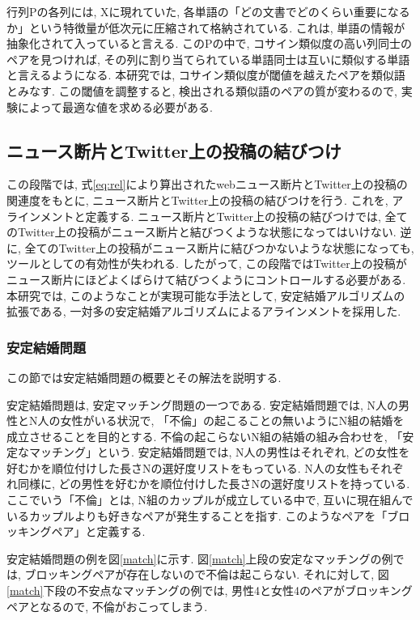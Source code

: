 \documentclass[12pt]{jarticle}
\begin{document}
行列Pの各列には, Xに現れていた, 各単語の「どの文書でどのくらい重要になるか」という特徴量が低次元に圧縮されて格納されている. これは, 単語の情報が抽象化されて入っていると言える. このPの中で, コサイン類似度の高い列同士のペアを見つければ, その列に割り当てられている単語同士は互いに類似する単語と言えるようになる. 本研究では, コサイン類似度が閾値を越えたペアを類似語とみなす. この閾値を調整すると, 検出される類似語のペアの質が変わるので, 実験によって最適な値を求める必要がある.

\subsection{ニュース断片とTwitter上の投稿の結びつけ}
この段階では, 式\ref{eq:rel}により算出されたwebニュース断片とTwitter上の投稿の関連度をもとに, ニュース断片とTwitter上の投稿の結びつけを行う. これを, アラインメントと定義する. ニュース断片とTwitter上の投稿の結びつけでは, 全てのTwitter上の投稿がニュース断片と結びつくような状態になってはいけない. 逆に, 全てのTwitter上の投稿がニュース断片に結びつかないような状態になっても, ツールとしての有効性が失われる. したがって, この段階ではTwitter上の投稿がニュース断片にほどよくばらけて結びつくようにコントロールする必要がある. 本研究では, このようなことが実現可能な手法として, 安定結婚アルゴリズム\cite{smp}の拡張である, 一対多の安定結婚アルゴリズム\cite{psmp}によるアラインメントを採用した.

\subsubsection{安定結婚問題}
この節では安定結婚問題の概要とその解法を説明する.

安定結婚問題\cite{smp}は, 安定マッチング問題の一つである.
安定結婚問題では, N人の男性とN人の女性がいる状況で, 「不倫」の起こることの無いようにN組の結婚を成立させることを目的とする.
不倫の起こらないN組の結婚の組み合わせを, 「安定なマッチング」という.
安定結婚問題では, N人の男性はそれぞれ, どの女性を好むかを順位付けした長さNの選好度リストをもっている.
N人の女性もそれぞれ同様に, どの男性を好むかを順位付けした長さNの選好度リストを持っている.
ここでいう「不倫」とは, N組のカップルが成立している中で, 互いに現在組んでいるカップルよりも好きなペアが発生することを指す.
このようなペアを「ブロッキングペア」と定義する.

安定結婚問題の例を図\ref{match}に示す. 図\ref{match}上段の安定なマッチングの例では, ブロッキングペアが存在しないので不倫は起こらない.
それに対して, 図\ref{match}下段の不安点なマッチングの例では, 男性4と女性4のペアがブロッキングペアとなるので, 不倫がおこってしまう.
\end{document}
